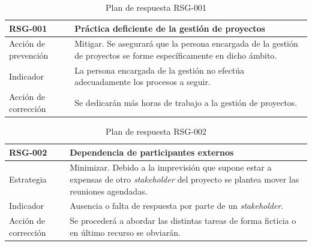 \begin{table}[htpb]
\centering
\begin{tabularx}{\textwidth}{|l|X|}
\hline
\textbf{RSG-001}              & \textbf{Práctica deficiente de la gestión de proyectos} \\ \hline
Acción de prevención & Mitigar. Se asegurará que la persona encargada de la gestión de proyectos se forme específicamente en dicho ámbito. \\ \hline
Indicador            & La persona encargada de la gestión no efectúa adecuadamente los procesos a seguir.                                  \\ \hline
Acción de corrección & Se dedicarán más horas de trabajo a la gestión de proyectos.                                                        \\ \hline
\end{tabularx}
\caption{Plan de respuesta RSG-001}
\end{table}


\begin{table}[htpb]
\centering
\begin{tabularx}{\textwidth}{|l|X|}
\hline
\textbf{RSG-002}              & \textbf{Dependencia de participantes externos}                                                                                                                                                                  \\ \hline
Estrategia & Minimizar. Debido a la imprevisión que supone estar a expensas de otro \textit{stakeholder} del proyecto se plantea mover las reuniones agendadas. \\ \hline
Indicador            & Ausencia o falta de respuesta por parte de un \textit{stakeholder}.                                                                                                                                             \\ \hline
Acción de corrección & Se procederá a abordar las distintas tareas de forma ficticia o en último recurso se obviarán.                                                                                                        \\ \hline
\end{tabularx}
\caption{Plan de respuesta RSG-002}
\end{table}


